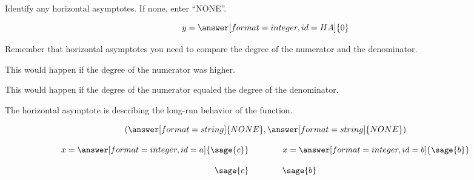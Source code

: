 {\begin{problem}
\begin{problem}
\begin{problem}

Identify any horizontal asymptotes.  If none, enter ``NONE''.

\[y=\answer[format=integer,id=HA]{0}\]

\begin{feedback}[attempt]
Remember that horizontal asymptotes you need to compare the degree of the numerator and the denominator.
\end{feedback}

\begin{feedback}[HA>1]
This would happen if the degree of the numerator was higher.
\end{feedback}

\begin{feedback}[HA=1]
This would happen if the degree of the numerator equaled the degree of the denominator.
\end{feedback}

\begin{feedback}[correct]
The horizontal asymptote is describing the long-run behavior of the function.
\end{feedback}


\end{problem}

\[(\answer[format=string]{NONE}, \answer[format=string]{NONE})\]

\end{problem}

  \begin{validator}[a^2+b^2==$\sage{square}$]
\[x=\answer[format=integer,id=a]{\sage{c}}\qquad\qquad x=\answer[format=integer,id=b]{\sage{b}}\]
  \end{validator}

\[\sage{c}  \qquad\qquad  \sage{b}\]

\end{problem}}%




